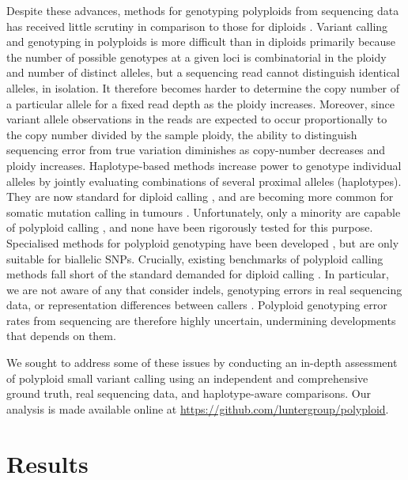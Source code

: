 \documentclass[notitlepage, twocolumn, 10pt]{article}
\begin{document}
Despite these advances, methods for genotyping polyploids from sequencing data has received little scrutiny in comparison to those for diploids \cite{RN677, RN651, RN605, RN675}. Variant calling and genotyping in polyploids is more difficult than in diploids primarily because the number of possible genotypes at a given loci is combinatorial in the ploidy and number of distinct alleles, but a sequencing read cannot distinguish identical alleles, in isolation. It therefore becomes harder to determine the copy number of a particular allele for a fixed read depth as the ploidy increases. Moreover, since variant allele observations in the reads are expected to occur proportionally to the copy number divided by the sample ploidy, the ability to distinguish sequencing error from true variation diminishes as copy-number decreases and ploidy increases. Haplotype-based methods increase  power to genotype individual alleles by jointly evaluating combinations of several proximal alleles (haplotypes). They are now standard for diploid calling \cite{RN663, RN598, RN538, RN604, RN619, RN5}, and are becoming more common for somatic mutation calling in tumours \cite{RN663}. Unfortunately, only a minority are capable of polyploid calling \cite{RN663, RN598, RN538}, and none have been rigorously tested for this purpose. Specialised methods for polyploid genotyping have been developed \cite{RN666, RN662, RN674}, but are only suitable for biallelic SNPs. Crucially, existing benchmarks of polyploid calling methods fall short of the standard demanded for diploid calling \cite{RN678, RN655, RN656, RN675}. In particular, we are not aware of any that consider indels, genotyping errors in real sequencing data, or representation differences between callers \cite{RN675}. Polyploid genotyping error rates from sequencing are therefore highly uncertain, undermining developments that depends on them.

We sought to address some of these issues by conducting an in-depth assessment of polyploid small variant calling using an independent and comprehensive ground truth, real sequencing data, and haplotype-aware comparisons. Our analysis is made available online at \url{https://github.com/luntergroup/polyploid}.

\section*{Results}
\end{document}
